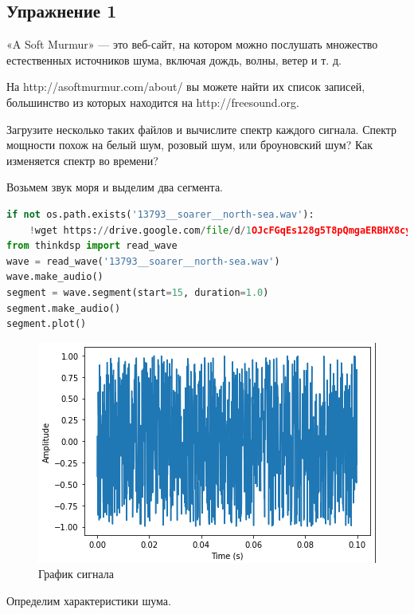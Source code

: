 \subsection{Упражнение 1}

«A Soft Murmur» — это веб-сайт, на котором можно послушать множество естественных источников шума, включая дождь, волны, ветер и т. д. 

\noindent На http://asoftmurmur.com/about/ вы можете найти их список записей, большинство из которых находится на http://freesound.org.

\noindent Загрузите несколько таких файлов и вычислите спектр каждого сигнала. Спектр мощности похож на белый шум, розовый шум, или броуновский шум? Как изменяется спектр во времени?

Возьмем звук моря и выделим два сегмента.

\begin{lstlisting}[language=Python]
if not os.path.exists('13793__soarer__north-sea.wav'):
    !wget https://drive.google.com/file/d/1OJcFGqEs128g5T8pQmgaERBHX8cyFSsT/view?usp=sharing
from thinkdsp import read_wave
wave = read_wave('13793__soarer__north-sea.wav')
wave.make_audio()
segment = wave.segment(start=15, duration=1.0)
segment.make_audio()
segment.plot()
\end{lstlisting}
\begin{figure}[H]
	\begin{center}
		\includegraphics[scale=1]{fig/lab04/lab4_1.png}
		\caption{График сигнала}
	\end{center}
\end{figure}

Определим характеристики шума.

